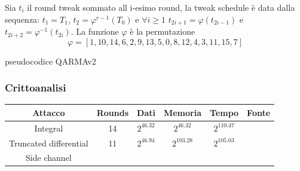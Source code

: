 \documentclass[target=bach,aauheader=,style=]{thud}
\begin{document}
			Sia $t_i$ il round tweak sommato all i-esimo round, la tweak schedule è data dalla sequenza: $t_1 = T_1$, $t_2 = \varphi^{r-1}(T_0)$ e $\forall i \ge 1$ $t_{2i+1} = \varphi (t_{2i-1})$ e $t_{2i+2} = \varphi^{-1} (t_{2i})$. La funzione $\varphi$ è la permutazione
			\[\varphi = [1,10,14,6,2,9,13,5,0,8,12,4,3,11,15,7]\]
			
			\begin{algorithm}
				\caption{pseudocodice QARMAv2}
				\begin{algorithmic}
						\Else
						\EndIf
					\EndFor
						\Else
						\EndIf
					\EndFor
					\EndProcedure
				\end{algorithmic}
			\end{algorithm}
			\subsubsection{Crittoanalisi}
			\begin{center}
				\begin{tabular}{ |c|c|c|c|c|c| } 
					\hline
					Attacco & Rounds & Dati & Memoria & Tempo & Fonte \\ 
					\hline 
					\hline
					Integral & 14 & $2^{46.32}$ & $2^{46.32}$ & $2^{110.47}$ & \cite{qarmanal}\\
					\hline
					Truncated differential & 11 & $2^{46.94}$ & $2^{103.28}$ & $2^{105.03}$ & \cite{qarmatrunc}\\
					\hline
					Side channel & & & & & \cite{qarmaside}\\
					\hline
				\end{tabular}
			\end{center}
\end{document}
